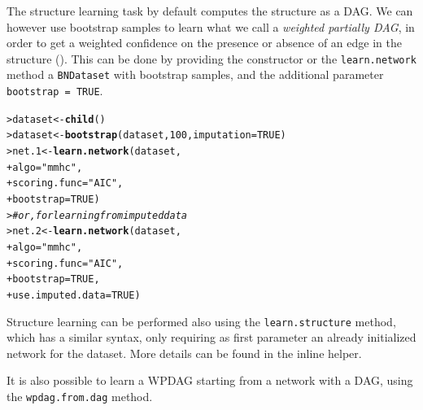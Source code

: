 \documentclass{article}\usepackage[]{graphicx}\usepackage[]{color}
\makeatletter
\newcommand{\hlnum}[1]{\textcolor[rgb]{0.686,0.059,0.569}{#1}}%
\newcommand{\hlstr}[1]{\textcolor[rgb]{0.192,0.494,0.8}{#1}}%
\newcommand{\hlcom}[1]{\textcolor[rgb]{0.678,0.584,0.686}{\textit{#1}}}%
\newcommand{\hlstd}[1]{\textcolor[rgb]{0.345,0.345,0.345}{#1}}%
\newcommand{\hlkwb}[1]{\textcolor[rgb]{0.69,0.353,0.396}{#1}}%
\newcommand{\hlkwc}[1]{\textcolor[rgb]{0.333,0.667,0.333}{#1}}%
\newcommand{\hlkwd}[1]{\textcolor[rgb]{0.737,0.353,0.396}{\textbf{#1}}}%
\newenvironment{kframe}{%
 \def\at@end@of@kframe{}%
 \ifinner\ifhmode%
  \def\at@end@of@kframe{\end{minipage}}%
  \begin{minipage}{\columnwidth}%
 \fi\fi%
 \def\FrameCommand##1{\hskip\@totalleftmargin \hskip-\fboxsep
 \colorbox{shadecolor}{##1}\hskip-\fboxsep
     \hskip-\linewidth \hskip-\@totalleftmargin \hskip\columnwidth}%
 \MakeFramed {\advance\hsize-\width
   \@totalleftmargin\z@ \linewidth\hsize
   \@setminipage}}%
 {\par\unskip\endMakeFramed%
 \at@end@of@kframe}
\newenvironment{knitrout}{}{} %
\newcommand{\Robject}[1]{{\texttt{#1}}}
\newcommand{\Rmethod}[1]{{\texttt{#1}}}
\newcommand{\Rfunarg}[1]{{\texttt{#1}}}
\makeatother
\begin{document}
The structure learning task by default computes the structure as a DAG. We can however use
bootstrap samples to learn what we call a \textit{weighted partially DAG}, in order to get a weighted confidence on the presence or
absence of an edge in the structure (\citet*{friedman1999data}). This can be done by providing the constructor or the \Rmethod{learn.network}
method a \Robject{BNDataset} with bootstrap samples, and the additional parameter \Rfunarg{bootstrap = TRUE}.

\begin{knitrout}
\color{fgcolor}\begin{kframe}
\begin{alltt}
\hlstd{> }\hlstd{dataset} \hlkwb{<-} \hlkwd{child}\hlstd{()}
\hlstd{> }\hlstd{dataset} \hlkwb{<-} \hlkwd{bootstrap}\hlstd{(dataset,} \hlnum{100}\hlstd{,} \hlkwc{imputation} \hlstd{=} \hlnum{TRUE}\hlstd{)}
\hlstd{> }\hlstd{net.1}   \hlkwb{<-} \hlkwd{learn.network}\hlstd{(dataset,}
\hlstd{+ }                         \hlkwc{algo} \hlstd{=} \hlstr{"mmhc"}\hlstd{,}
\hlstd{+ }                         \hlkwc{scoring.func} \hlstd{=} \hlstr{"AIC"}\hlstd{,}
\hlstd{+ }                         \hlkwc{bootstrap} \hlstd{=} \hlnum{TRUE}\hlstd{)}
\hlstd{> }\hlcom{# or, for learning from imputed data}
\hlstd{> }\hlstd{net.2}   \hlkwb{<-} \hlkwd{learn.network}\hlstd{(dataset,}
\hlstd{+ }                         \hlkwc{algo} \hlstd{=} \hlstr{"mmhc"}\hlstd{,}
\hlstd{+ }                         \hlkwc{scoring.func} \hlstd{=} \hlstr{"AIC"}\hlstd{,}
\hlstd{+ }                         \hlkwc{bootstrap} \hlstd{=} \hlnum{TRUE}\hlstd{,}
\hlstd{+ }                         \hlkwc{use.imputed.data} \hlstd{=} \hlnum{TRUE}\hlstd{)}
\end{alltt}
\end{kframe}
\end{knitrout}

Structure learning can be performed also using the \Rmethod{learn.structure} method, which has a similar syntax, only requiring as
first parameter an already initialized network for the dataset. More details can be found in the inline helper.

It is also possible to learn a WPDAG starting from a network with a DAG, using the \Rmethod{wpdag.from.dag} method.
\end{document}
